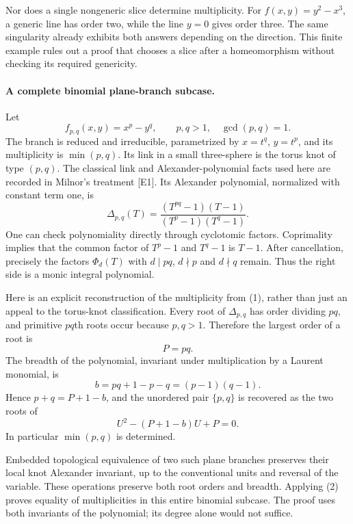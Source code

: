 \documentclass[11pt]{article}
\begin{document}
Nor does a single nongeneric slice determine multiplicity. For $f(x,y)=y^2-x^3$, a generic line has order two, while the line $y=0$ gives order three. The same singularity already exhibits both answers depending on the direction. This finite example rules out a proof that chooses a slice after a homeomorphism without checking its required genericity.

\paragraph{A complete binomial plane-branch subcase.}
Let
\[
 f_{p,q}(x,y)=x^p-y^q,\qquad p,q>1,\quad\gcd(p,q)=1.
\]
The branch is reduced and irreducible, parametrized by $x=t^q$, $y=t^p$, and its multiplicity is $\min(p,q)$. Its link in a small three-sphere is the torus knot of type $(p,q)$. The classical link and Alexander-polynomial facts used here are recorded in Milnor's treatment [E1]. Its Alexander polynomial, normalized with constant term one, is
\[
 \Delta_{p,q}(T)=
 \frac{(T^{pq}-1)(T-1)}{(T^p-1)(T^q-1)}.                 \tag{1}
\]
One can check polynomiality directly through cyclotomic factors. Coprimality implies that the common factor of $T^p-1$ and $T^q-1$ is $T-1$. After cancellation, precisely the factors $\Phi_d(T)$ with $d\mid pq$, $d\nmid p$ and $d\nmid q$ remain. Thus the right side is a monic integral polynomial.

Here is an explicit reconstruction of the multiplicity from (1), rather than just an appeal to the torus-knot classification. Every root of $\Delta_{p,q}$ has order dividing $pq$, and primitive $pq$th roots occur because $p,q>1$. Therefore the largest order of a root is
\[
 P=pq.
\]
The breadth of the polynomial, invariant under multiplication by a Laurent monomial, is
\[
 b=pq+1-p-q=(p-1)(q-1).
\]
Hence $p+q=P+1-b$, and the unordered pair $\{p,q\}$ is recovered as the two roots of
\[
 U^2-(P+1-b)U+P=0.                                       \tag{2}
\]
In particular $\min(p,q)$ is determined.

Embedded topological equivalence of two such plane branches preserves their local knot Alexander invariant, up to the conventional units and reversal of the variable. These operations preserve both root orders and breadth. Applying (2) proves equality of multiplicities in this entire binomial subcase. The proof uses both invariants of the polynomial; its degree alone would not suffice.
\end{document}
